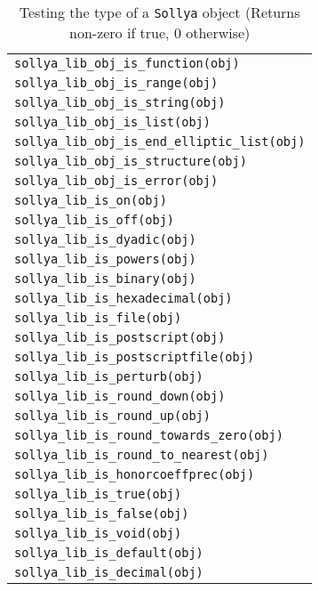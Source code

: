 \documentclass[a4paper]{article}
\newcommand{\sollya}{\texttt{Sollya}\xspace}
\begin{document}
\begin{table}[htp]
  \caption{Testing the type of a \sollya object (Returns non-zero if true, 0 otherwise)}
  \label{type_of_an_object}
  \begin{center}
    \begin{tabular}{|l|}
      \hline
      \verb|sollya_lib_obj_is_function(obj)| \\
      \verb|sollya_lib_obj_is_range(obj)| \\
      \verb|sollya_lib_obj_is_string(obj)| \\
      \verb|sollya_lib_obj_is_list(obj)| \\
      \verb|sollya_lib_obj_is_end_elliptic_list(obj)| \\
      \verb|sollya_lib_obj_is_structure(obj)| \\
      \verb|sollya_lib_obj_is_error(obj)|\\[0.1cm]
      \hline
      \verb|sollya_lib_is_on(obj)|\phantom{\Large{$A^A$}} \\
      \verb|sollya_lib_is_off(obj)| \\
      \verb|sollya_lib_is_dyadic(obj)| \\
      \verb|sollya_lib_is_powers(obj)| \\
      \verb|sollya_lib_is_binary(obj)| \\
      \verb|sollya_lib_is_hexadecimal(obj)| \\
      \verb|sollya_lib_is_file(obj)| \\
      \verb|sollya_lib_is_postscript(obj)| \\
      \verb|sollya_lib_is_postscriptfile(obj)| \\
      \verb|sollya_lib_is_perturb(obj)| \\
      \verb|sollya_lib_is_round_down(obj)| \\
      \verb|sollya_lib_is_round_up(obj)| \\
      \verb|sollya_lib_is_round_towards_zero(obj)| \\
      \verb|sollya_lib_is_round_to_nearest(obj)| \\
      \verb|sollya_lib_is_honorcoeffprec(obj)| \\
      \verb|sollya_lib_is_true(obj)| \\
      \verb|sollya_lib_is_false(obj)| \\
      \verb|sollya_lib_is_void(obj)| \\
      \verb|sollya_lib_is_default(obj)| \\
      \verb|sollya_lib_is_decimal(obj)| \\

\end{tabular}
\end{center}
\end{table}
\end{document}
